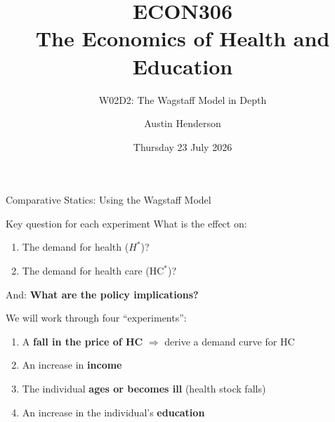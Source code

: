 \documentclass[aspectratio=169, 12pt]{beamer}
\title[ECON306: W02D2 — Wagstaff Model]{ECON306\\The Economics of Health and Education}
\subtitle{W02D2: The Wagstaff Model in Depth}
\author{Austin Henderson}
\institute{Department of Economics\\University of Otago}
\date{Thursday 23 July 2026}
\begin{document}
\begin{frame}[plain]
  \titlepage
\end{frame}



\begin{frame}{Comparative Statics: Using the Wagstaff Model}
  \begin{block}{Key question for each experiment}
    What is the effect on:
    \begin{enumerate}
      \item The demand for health ($H^*$)?
      \item The demand for health care ($\text{HC}^*$)?
    \end{enumerate}
    And: \textbf{What are the policy implications?}
  \end{block}
  \vspace{0.4em}
  We will work through four ``experiments'':
  \begin{enumerate}
    \item A \textbf{fall in the price of HC} $\Rightarrow$ derive a demand curve for HC
    \item An increase in \textbf{income}
    \item The individual \textbf{ages or becomes ill} (health stock falls)
    \item An increase in the individual's \textbf{education}
  \end{enumerate}
\end{frame}
\end{document}
